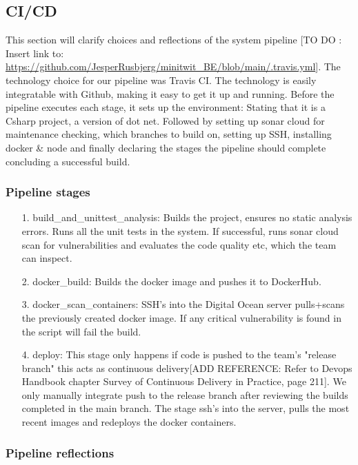 \subsection{CI/CD}
\label{cicd:label}

This section will clarify choices and reflections of the system pipeline [TO DO : Insert link to: \url{https://github.com/JesperRusbjerg/minitwit_BE/blob/main/.travis.yml}]. The technology choice for our pipeline was Travis CI. The technology is easily integratable with Github, making it easy to get it up and running. Before the pipeline executes each stage, it sets up the environment: Stating that it is a Csharp project, a version of dot net. Followed by setting up sonar cloud for maintenance checking, which branches to build on, setting up SSH, installing docker \& node and finally declaring the stages the pipeline should complete concluding a successful build.

\subsubsection*{Pipeline stages}

\begin{enumerate}
  \item[1.] build\_and\_unittest\_analysis: Builds the project, ensures no static analysis errors. Runs all the unit tests in the system. If successful, runs sonar cloud scan for vulnerabilities and evaluates the code quality etc, which the team can inspect.
  \item[2.] docker\_build: Builds the docker image and pushes it to DockerHub.
  \item[3.] docker\_scan\_containers: SSH's into the Digital Ocean server pulls+scans the previously created docker image. If any critical vulnerability is found in the script will fail the build.
  \item[4.] deploy: This stage only happens if code is pushed to the team's "release branch" this acts as continuous delivery[ADD REFERENCE: Refer to Devops Handbook chapter Survey of Continuous Delivery in Practice, page 211]. We only manually integrate push to the release branch after reviewing the builds completed in the main branch. The stage ssh's into the server, pulls the most recent images and redeploys the docker containers.
\end{enumerate}

\subsubsection*{Pipeline reflections}


